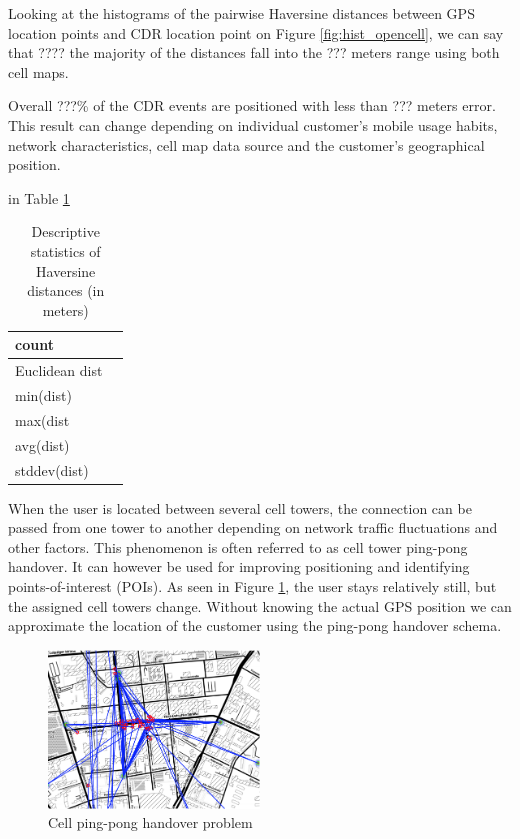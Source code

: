 Looking at the histograms of the pairwise Haversine distances between GPS location points and CDR location point on Figure \ref{fig:hist_opencell}, we can say that ???? the majority of the distances fall into the ??? meters range using both cell maps. 

Overall ???\% of the CDR events are positioned with less than ??? meters error. This result can change depending on individual customer's mobile usage habits, network characteristics, cell map data source and the customer's geographical position.

in Table \ref{tab:dist_stats}

\begin{table}[h]
    \centering
    \begin{tabular}{|l|c|}
        \hline 
        count &  \\
        \hline
        Euclidean dist &  \\
        \hline
        min(dist) &  \\
        \hline
        max(dist &   \\
        \hline
        avg(dist) &  \\
        \hline
        stddev(dist) &  \\
        \hline
    \end{tabular}
    \caption{Descriptive statistics of Haversine distances (in meters)}
    \label{tab:dist_stats}
\end{table}

When the user is located between several cell towers, the connection can be passed from one tower to another depending on network traffic fluctuations and other factors. This phenomenon is often referred to as cell tower ping-pong handover. It can however be used for improving positioning and identifying points-of-interest (POIs). As seen in Figure \ref{fig:ping-pong}, the user stays relatively still, but the assigned cell towers change. Without knowing the actual GPS position we can approximate the location of the customer using the ping-pong handover schema.

\begin{figure}[h]
    \centering
    \includegraphics[width=0.5\textwidth]{images/ping-pong.png}
    \caption{Cell ping-pong handover problem}
    \label{fig:ping-pong}
\end{figure}

